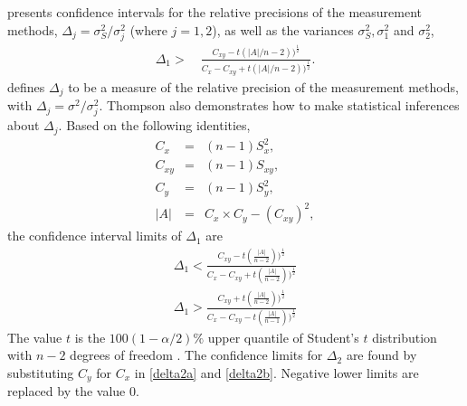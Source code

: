 \documentclass[12pt, a4paper]{report}
\theoremstyle{plain}
\theoremstyle{definition}
\theoremstyle{remark}
\begin{document}
\citet{Thompson} presents confidence intervals for the relative
precisions of the measurement methods, $\Delta_{j}=
\sigma^2_{S}/\sigma^2_{j}$ (where $j=1,2$), as well as the
variances $\sigma^{2}_{S}, \sigma^{2}_{1}$ and $\sigma^{2}_{2}$,
\begin{eqnarray}
\Delta_{1} >\quad \frac{C_{xy}-
	t(|A|/n-2))^{\frac{1}{2}}}{C_{x}-C_{xy}+
	t(|A|/n-2))^{\frac{1}{2}}}.
\end{eqnarray}
\citet{Thompson} defines $\Delta_{j}$ to be a measure of the
relative precision of the measurement methods, with $\Delta_{j}=
\sigma^2/\sigma^2_{j}$. Thompson also demonstrates how to make statistical inferences about $\Delta_{j}$.
Based on the following identities,
\begin{eqnarray*}
	C_{x}&=&(n-1)S^2_{x},\nonumber\\
	C_{xy}&=&(n-1)S_{xy},\nonumber\\
	C_{y}&=&(n-1)S^2_{y},\nonumber\\
	|A| &=& C_{x}\times C_{y} - (C_{xy})^2,\nonumber
\end{eqnarray*}
\noindent the confidence interval limits of $\Delta_{1}$ are
\begin{eqnarray}
\Delta_{1} < \frac{C_{xy}-
	t(\frac{|A|}{n-2}))^{\frac{1}{2}}}{C_{x}-C_{xy}+
	t(\frac{|A|}{n-2}))^{\frac{1}{2}}} \label{delta2a} \\
\Delta_{1} > \frac{C_{xy}+
	t(\frac{|A|}{n-2}))^{\frac{1}{2}}}{C_{x}-C_{xy}-
	t(\frac{|A|}{n-1}))^{\frac{1}{2}}} \label{delta2b}
\end{eqnarray}
The value $t$ is the $100(1-\alpha/2)\%$ upper quantile of
Student's $t$ distribution with $n-2$ degrees of freedom
\citep{Kinsella}. The confidence limits for $\Delta_{2}$ are found by substituting $C_{y}$ for $C_{x}$ in \ref{delta2a} and \ref{delta2b}.
Negative lower limits are replaced by the value $0$.


\end{document}
